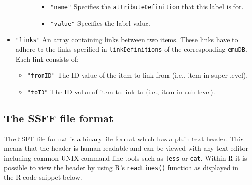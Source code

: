 \documentclass[]{book}
\begin{document}
\begin{itemize}
\begin{itemize}
\begin{itemize}
      \begin{itemize}
      \item
        \texttt{"name"} Specifies the \texttt{attributeDefinition} that this
        label is for.
      \item
        \texttt{"value"} Specifies the label value.
      \end{itemize}
    \end{itemize}
  \end{itemize}
\item
  \texttt{"links"} An array containing links between two items. These links have to adhere to the links specified in \texttt{linkDefinitions} of the corresponding \texttt{emuDB}. Each link consists of:

  \begin{itemize}
  \item
    \texttt{"fromID"} The ID value of the item to link from (i.e., item in super-level).
  \item
    \texttt{"toID"} The ID value of item to link to (i.e., item in sub-level).
  \end{itemize}
\end{itemize}

\hypertarget{subsec:app-chapFileFormatsSSFF}{%
\subsection{The SSFF file format}\label{subsec:app-chapFileFormatsSSFF}}

The SSFF file format is a binary file format which has a plain text header. This means that the header is human-readable and can be viewed with any text editor including common UNIX command line tools such as \texttt{less} or \texttt{cat}. Within R it is possible to view the header by using R's \texttt{readLines()} function as displayed in the R code snippet below.
\end{document}
